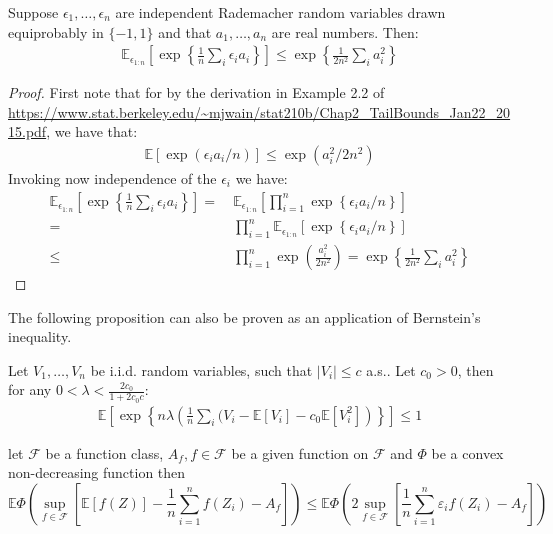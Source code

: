 \documentclass[12pt]{extarticle} %
\begin{document}
\begin{lemma}\label{lem:hoeffding}
Suppose $\epsilon_1, \ldots, \epsilon_n$ are independent Rademacher random variables drawn equiprobably in $\{-1, 1\}$ and that $a_1,\ldots, a_n$ are real numbers. Then:
\begin{align}
    \mathbb{E}_{\epsilon_{1:n}}\left[\exp\left\{\frac{1}{n} \sum_i \epsilon_i a_i \right\}\right] \leq \exp\left\{\frac{1}{2n^2} \sum_i a_i^2 \right\}
\end{align}
\end{lemma}
\begin{proof}
First note that for by the derivation in Example 2.2 of \url{https://www.stat.berkeley.edu/~mjwain/stat210b/Chap2_TailBounds_Jan22_2015.pdf}, we have that:
\begin{align}
    \mathbb{E}[\exp(\epsilon_i a_i/n)] \leq \exp(a_i^2/2n^2)
\end{align}
Invoking now independence of the $\epsilon_i$ we have:
\begin{align}
    \mathbb{E}_{\epsilon_{1:n}}\left[\exp\left\{\frac{1}{n}\sum_i \epsilon_i a_i \right\}\right] =~& \mathbb{E}_{\epsilon_{1:n}}\left[\prod_{i=1}^n \exp\left\{\epsilon_i a_i/n \right\}\right]\\
    =~& \prod_{i=1}^n \mathbb{E}_{\epsilon_{1:n}}\left[ \exp\left\{\epsilon_i a_i/n \right\}\right] \tag{independence}\\
    \leq~& \prod_{i=1}^n \exp\left(\frac{a_i^2}{2n^2}\right) = \exp\left\{\frac{1}{2n^2} \sum_i a_i^2 \right\}
\end{align}
\end{proof}

The following proposition can also be proven as an application of Bernstein's inequality.
\begin{lemma}\label{lem:bernstein}
Let $V_1,\ldots, V_n$ be i.i.d. random variables, such that $|V_i|\leq c$ a.s.. Let $c_0>0$, then for any $0< \lambda < \frac{2c_0}{1+ 2c_0 c}$:
\begin{align}
    \mathbb{E}\left[\exp\left\{n\lambda \left( \frac{1}{n}\sum_i (V_i - \mathbb{E}[V_i] - c_0 \mathbb{E}[V_i^2]\right)\right\}\right] \leq 1  
\end{align}
\end{lemma}

\begin{lemma}\label{sym}
    let $\mathcal{F}$ be a function class, $A_f, f \in \mathcal{F}$ be a given function on $\mathcal{F}$ and $\Phi$ be a convex non-decreasing function then
    $$
    \mathbb{E} \Phi\left(\sup _{f \in \mathcal{F}}\left[\mathbb{E}[f(Z)]-\frac{1}{n}\sum_{i=1}^{n} f(Z_i)-A_f\right]\right) \leq \mathbb{E} \Phi\left(2 \sup _{f \in \mathcal{F}}\left[\frac{1}{n}\sum_{i=1}^{n} \varepsilon_i f(Z_i)-A_f\right]\right)
    $$
\end{lemma}
\end{document}
